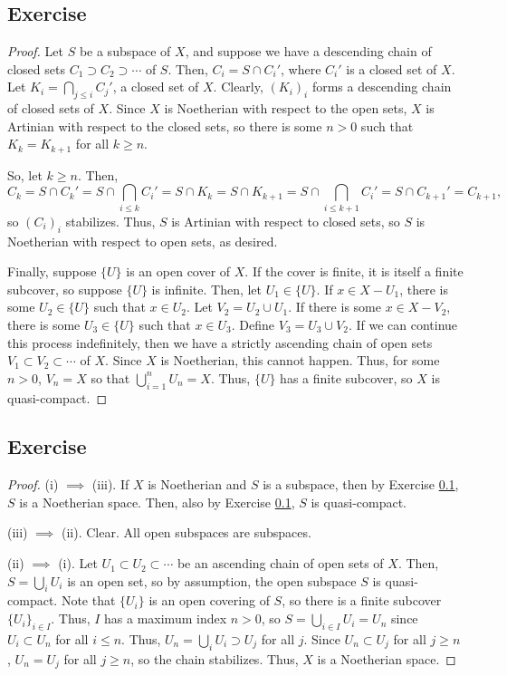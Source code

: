 \subsection{Exercise}\label{6.5}

\begin{proof}
Let $S$ be a subspace of $X$, and suppose we have a descending chain of closed sets $C_1 \supset C_2 \supset \cdots$ of $S$. Then,
$C_i = S \cap C_i'$, where $C_i'$ is a closed set of $X$. Let $K_i = \bigcap_{j \le i} C_j'$, a closed set of $X$. Clearly, $(K_i)_i$
forms a descending chain of closed sets of $X$. Since $X$ is Noetherian with respect to the open sets, $X$ is Artinian with respect 
to the closed sets, so there is some $n > 0$ such that $K_k = K_{k+1}$ for all $k \ge n$.

So, let $k \ge n$. Then, 
$$C_k = S \cap C_k' = S \cap \bigcap_{i \le k} C_i' = S \cap K_k = S \cap K_{k+1} = S \cap \bigcap_{i \le k+1} C_i' = S \cap C_{k+1}' = C_{k+1},$$
so $(C_i)_i$ stabilizes. Thus, $S$ is Artinian with respect to closed sets, so $S$ is Noetherian with respect to open sets, as desired.

Finally, suppose $\{U\}$ is an open cover of $X$. If the cover is finite, it is itself a finite subcover, so suppose $\{U\}$ is infinite.
Then, let $U_1 \in \{U\}$. If $x \in X - U_1$, there is some $U_2 \in \{U\}$ such that $x \in U_2$. Let $V_2 = U_2 \cup U_1$.
If there is some $x \in X - V_2$, there is some $U_3 \in \{U\}$ such that $x \in U_3$. Define $V_3 = U_3 \cup V_2$. If we can continue this process 
indefinitely, then we have a strictly ascending chain of open sets $V_1 \subset V_2 \subset \cdots$ of $X$. Since $X$ is Noetherian, this cannot happen.
Thus, for some $n > 0$, $V_n = X$ so that $\bigcup_{i=1}^n U_n = X$. Thus, $\{U\}$ has a finite subcover, so $X$ is quasi-compact.
\end{proof}

\subsection{Exercise}\label{6.6}

\begin{proof}
(i) $\implies$ (iii). If $X$ is Noetherian and $S$ is a subspace, then by Exercise \ref{6.5}, $S$ is a Noetherian space. Then, also by Exercise \ref{6.5},
$S$ is quasi-compact.

(iii) $\implies$ (ii). Clear. All open subspaces are subspaces.

(ii) $\implies$ (i). Let $U_1 \subset U_2 \subset \cdots$ be an ascending chain of open sets of $X$. Then, $S = \bigcup_i U_i$ is an open set, so by
assumption, the open subspace $S$ is quasi-compact. Note that $\{U_i\}$ is an open covering of $S$, so there is a finite subcover $\{U_i\}_{i \in I}$.
Thus, $I$ has a maximum index $n > 0$, so $S = \bigcup_{i \in I} U_i = U_n$ since $U_i \subset U_n$ for all $i \le n$. Thus, $U_n = \bigcup_i U_i \supset U_j$
for all $j$. Since $U_n \subset U_j$ for all $j \ge n$, $U_n = U_j$ for all $j \ge n$, so the chain stabilizes. Thus, $X$ is a Noetherian space.
\end{proof}

